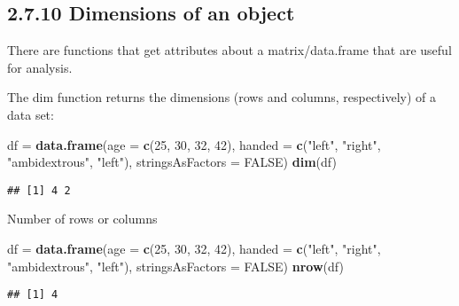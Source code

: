\documentclass[]{article}
\newenvironment{Shaded}{\begin{snugshade}}{\end{snugshade}}
\newcommand{\DataTypeTok}[1]{\textcolor[rgb]{0.13,0.29,0.53}{#1}}
\newcommand{\DecValTok}[1]{\textcolor[rgb]{0.00,0.00,0.81}{#1}}
\newcommand{\KeywordTok}[1]{\textcolor[rgb]{0.13,0.29,0.53}{\textbf{#1}}}
\newcommand{\NormalTok}[1]{#1}
\newcommand{\OtherTok}[1]{\textcolor[rgb]{0.56,0.35,0.01}{#1}}
\newcommand{\StringTok}[1]{\textcolor[rgb]{0.31,0.60,0.02}{#1}}
\begin{document}
\hypertarget{dimensions-of-an-object}{%
\subsection{2.7.10 Dimensions of an
object}\label{dimensions-of-an-object}}

There are functions that get attributes about a matrix/data.frame that
are useful for analysis.

The dim function returns the dimensions (rows and columns, respectively)
of a data set:

\begin{Shaded}
\begin{Highlighting}[]
\NormalTok{df =}\StringTok{ }\KeywordTok{data.frame}\NormalTok{(}\DataTypeTok{age =} \KeywordTok{c}\NormalTok{(}\DecValTok{25}\NormalTok{, }\DecValTok{30}\NormalTok{, }\DecValTok{32}\NormalTok{, }\DecValTok{42}\NormalTok{), }
                \DataTypeTok{handed =} \KeywordTok{c}\NormalTok{(}\StringTok{"left"}\NormalTok{, }\StringTok{"right"}\NormalTok{, }\StringTok{"ambidextrous"}\NormalTok{, }\StringTok{"left"}\NormalTok{), }
                \DataTypeTok{stringsAsFactors =} \OtherTok{FALSE}\NormalTok{)}
\KeywordTok{dim}\NormalTok{(df) }
\end{Highlighting}
\end{Shaded}

\begin{verbatim}
## [1] 4 2
\end{verbatim}

Number of rows or columns

\begin{Shaded}
\begin{Highlighting}[]
\NormalTok{df =}\StringTok{ }\KeywordTok{data.frame}\NormalTok{(}\DataTypeTok{age =} \KeywordTok{c}\NormalTok{(}\DecValTok{25}\NormalTok{, }\DecValTok{30}\NormalTok{, }\DecValTok{32}\NormalTok{, }\DecValTok{42}\NormalTok{), }
                \DataTypeTok{handed =} \KeywordTok{c}\NormalTok{(}\StringTok{"left"}\NormalTok{, }\StringTok{"right"}\NormalTok{, }\StringTok{"ambidextrous"}\NormalTok{, }\StringTok{"left"}\NormalTok{), }
                \DataTypeTok{stringsAsFactors =} \OtherTok{FALSE}\NormalTok{)}
\KeywordTok{nrow}\NormalTok{(df)}
\end{Highlighting}
\end{Shaded}

\begin{verbatim}
## [1] 4
\end{verbatim}
\end{document}
